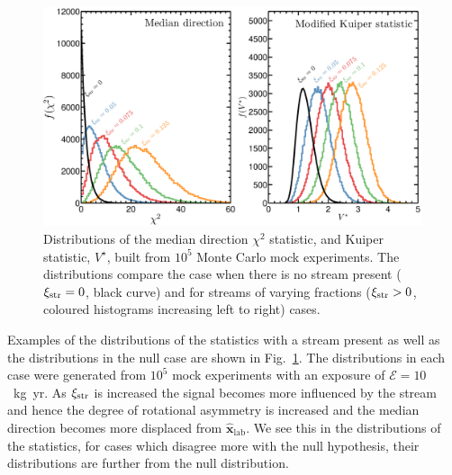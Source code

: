 \begin{figure}
      \centering
      \includegraphics[trim = 0mm 0mm 0mm 0mm, clip, width=0.99\textwidth]{Figures/dirstatsdists.eps}
      \caption[Distributions of statistics for varying stream densities]{Distributions of the median direction $\chi^2$ statistic, and Kuiper statistic, $V^\star$,  built from $10^5$ Monte Carlo mock experiments. The distributions compare the case when there is no stream  present ($\xi_{\rm str} = 0$, black curve) and for streams of varying fractions ($\xi_{\rm str} > 0$, coloured histograms increasing left to right) cases.}
      \label{fig:dirstatsdists}
\end{figure}
Examples of the distributions of the statistics with a stream present as well as the distributions in the null case are shown in Fig.~\ref{fig:dirstatsdists}. The distributions in each case were generated from $10^5$ mock experiments with an exposure of $\mathcal{E} = 10$~kg~yr. As $\xi_{\rm str}$ is increased the signal becomes more influenced by the stream and hence the degree of rotational asymmetry is increased and the median direction becomes more displaced from $\hat{\textbf{x}}_\textrm{lab}$. We see this in the distributions of the statistics, for cases which disagree more with the null hypothesis, their distributions are further from the null distribution.

